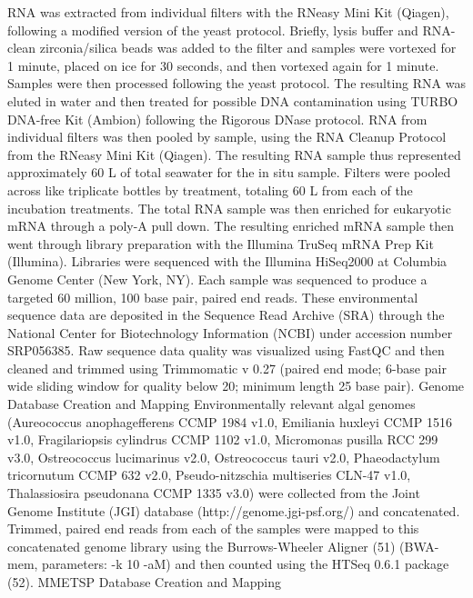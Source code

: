 RNA was extracted from individual filters with the RNeasy Mini Kit (Qiagen), following a modified version of the yeast protocol. Briefly, lysis buffer and RNA-clean zirconia/silica beads was added to the filter and samples were vortexed for 1 minute, placed on ice for 30 seconds, and then vortexed again for 1 minute. Samples were then processed following the yeast protocol. The resulting RNA was eluted in water and then treated for possible DNA contamination using TURBO DNA-free Kit (Ambion) following the Rigorous DNase protocol. RNA from individual filters was then pooled by sample, using the RNA Cleanup Protocol from the RNeasy Mini Kit (Qiagen). The resulting RNA sample thus represented approximately 60 L of total seawater for the in situ sample. Filters were pooled across like triplicate bottles by treatment, totaling 60 L from each of the incubation treatments. The total RNA sample was then enriched for eukaryotic mRNA through a poly-A pull down. The resulting enriched mRNA sample then went through library preparation with the Illumina TruSeq mRNA Prep Kit (Illumina). Libraries were sequenced with the Illumina HiSeq2000 at Columbia Genome Center (New York, NY). Each sample was sequenced to produce a targeted 60 million, 100 base pair, paired end reads. These environmental sequence data are deposited in the Sequence Read Archive (SRA) through the National Center for Biotechnology Information (NCBI) under accession number SRP056385. Raw sequence data quality was visualized using FastQC and then cleaned and trimmed using Trimmomatic v 0.27 (paired end mode; 6-base pair wide sliding window for quality below 20; minimum length 25 base pair). 
Genome Database Creation and Mapping
Environmentally relevant algal genomes (Aureococcus anophagefferens CCMP 1984 v1.0, Emiliania huxleyi CCMP 1516 v1.0, Fragilariopsis cylindrus CCMP 1102 v1.0, Micromonas pusilla RCC 299 v3.0, Ostreococcus lucimarinus v2.0, Ostreococcus tauri v2.0, Phaeodactylum tricornutum CCMP 632 v2.0, Pseudo-nitzschia multiseries CLN-47 v1.0, Thalassiosira pseudonana CCMP 1335 v3.0) were collected from the Joint Genome Institute (JGI) database (http://genome.jgi-psf.org/) and concatenated. Trimmed, paired end reads from each of the samples were mapped to this concatenated genome library using the Burrows-Wheeler Aligner (51) (BWA-mem, parameters: -k 10 -aM) and then counted using the HTSeq 0.6.1 package (52).
MMETSP Database Creation and Mapping
